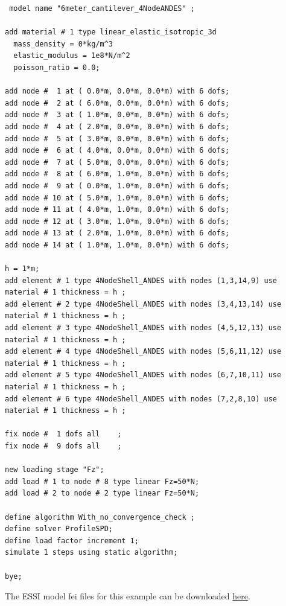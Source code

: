%
\begin{lstlisting}
 model name "6meter_cantilever_4NodeANDES" ;
      
add material # 1 type linear_elastic_isotropic_3d
  mass_density = 0*kg/m^3
  elastic_modulus = 1e8*N/m^2
  poisson_ratio = 0.0;

add node #  1 at ( 0.0*m, 0.0*m, 0.0*m) with 6 dofs;
add node #  2 at ( 6.0*m, 0.0*m, 0.0*m) with 6 dofs;
add node #  3 at ( 1.0*m, 0.0*m, 0.0*m) with 6 dofs;
add node #  4 at ( 2.0*m, 0.0*m, 0.0*m) with 6 dofs;
add node #  5 at ( 3.0*m, 0.0*m, 0.0*m) with 6 dofs;
add node #  6 at ( 4.0*m, 0.0*m, 0.0*m) with 6 dofs;
add node #  7 at ( 5.0*m, 0.0*m, 0.0*m) with 6 dofs;
add node #  8 at ( 6.0*m, 1.0*m, 0.0*m) with 6 dofs;
add node #  9 at ( 0.0*m, 1.0*m, 0.0*m) with 6 dofs;
add node # 10 at ( 5.0*m, 1.0*m, 0.0*m) with 6 dofs;
add node # 11 at ( 4.0*m, 1.0*m, 0.0*m) with 6 dofs;
add node # 12 at ( 3.0*m, 1.0*m, 0.0*m) with 6 dofs;
add node # 13 at ( 2.0*m, 1.0*m, 0.0*m) with 6 dofs;
add node # 14 at ( 1.0*m, 1.0*m, 0.0*m) with 6 dofs;

h = 1*m; 
add element # 1 type 4NodeShell_ANDES with nodes (1,3,14,9) use material # 1 thickness = h ; 
add element # 2 type 4NodeShell_ANDES with nodes (3,4,13,14) use material # 1 thickness = h ; 
add element # 3 type 4NodeShell_ANDES with nodes (4,5,12,13) use material # 1 thickness = h ; 
add element # 4 type 4NodeShell_ANDES with nodes (5,6,11,12) use material # 1 thickness = h ; 
add element # 5 type 4NodeShell_ANDES with nodes (6,7,10,11) use material # 1 thickness = h ; 
add element # 6 type 4NodeShell_ANDES with nodes (7,2,8,10) use material # 1 thickness = h ; 

fix node #  1 dofs all    ;
fix node #  9 dofs all    ;

new loading stage "Fz";
add load # 1 to node # 8 type linear Fz=50*N;
add load # 2 to node # 2 type linear Fz=50*N;

define algorithm With_no_convergence_check ;
define solver ProfileSPD;
define load factor increment 1;
simulate 1 steps using static algorithm;

bye;
\end{lstlisting}

The ESSI model fei files for this example can be downloaded 
\href{https://github.com/BorisJeremic/Real-ESSI-Examples/blob/master/model_fei_file/ANDESshell_cantilever_perpendicular_to_plane/ANDESshell_cantilever_perpendicular_to_plane.tgz?raw=true}{here}.








